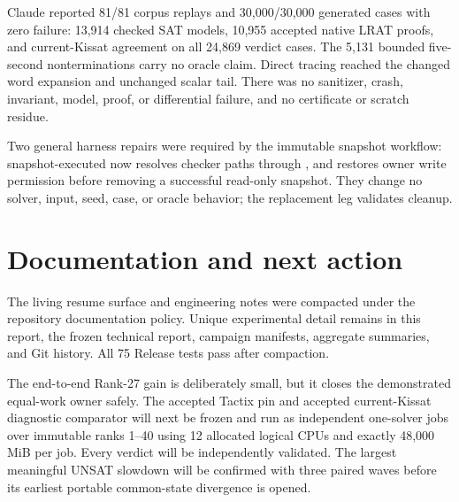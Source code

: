 \documentclass[11pt]{article}
\newcommand{\code}[1]{\texttt{\detokenize{#1}}}
\begin{document}
Claude reported 81/81 corpus replays and 30,000/30,000 generated cases with
zero failure: 13,914 checked SAT models, 10,955 accepted native LRAT proofs,
and current-Kissat agreement on all 24,869 verdict cases.  The 5,131 bounded
five-second nonterminations carry no oracle claim.  Direct tracing reached the
changed word expansion and unchanged scalar tail.  There was no sanitizer,
crash, invariant, model, proof, or differential failure, and no certificate or
scratch residue.

Two general harness repairs were required by the immutable snapshot workflow:
snapshot-executed \code{fuzz.py} now resolves checker paths through
\code{TACTIX_REPO_ROOT}, and \code{slurm.sh} restores owner write permission
before removing a successful read-only snapshot.  They change no solver,
input, seed, case, or oracle behavior; the replacement leg validates cleanup.

\section{Documentation and next action}
The living resume surface and engineering notes were compacted under the
repository documentation policy.  Unique experimental detail remains in this
report, the frozen technical report, campaign manifests, aggregate summaries,
and Git history.  All 75 Release tests pass after compaction.

The end-to-end Rank-27 gain is deliberately small, but it closes the demonstrated
equal-work owner safely.  The accepted Tactix pin and accepted current-Kissat
diagnostic comparator will next be frozen and run as independent one-solver
jobs over immutable ranks 1--40 using 12 allocated logical CPUs and exactly
48,000 MiB per job.  Every verdict will be independently validated.  The
largest meaningful UNSAT slowdown will be confirmed with three paired waves
before its earliest portable common-state divergence is opened.
\end{document}
